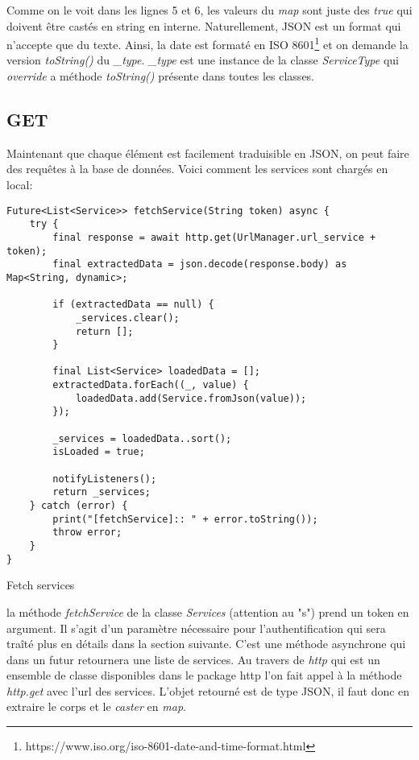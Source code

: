 Comme on le voit dans les lignes 5 et 6, les valeurs du \textit{map} sont juste des \textit{true} qui doivent être castés en string en interne.
Naturellement, JSON est un format qui n'accepte que du texte. Ainsi, la date est formaté en ISO 8601\footnote{https://www.iso.org/iso-8601-date-and-time-format.html} et on demande la version \textit{toString()} du \textit{\_type}. \textit{\_type} est une instance de la classe \textit{ServiceType} qui \textit{override} a méthode \textit{toString()} présente dans toutes les classes.
\newpage
\subsection*{GET}
Maintenant que chaque élément est facilement traduisible en JSON, on peut faire des requêtes à la base de données. Voici comment les services sont chargés en local:

\begin{listing}[!h]
\begin{verbatim}
Future<List<Service>> fetchService(String token) async {
    try {
        final response = await http.get(UrlManager.url_service + token);
        final extractedData = json.decode(response.body) as Map<String, dynamic>;

        if (extractedData == null) {
            _services.clear();
            return [];
        }

        final List<Service> loadedData = [];
        extractedData.forEach((_, value) {
            loadedData.add(Service.fromJson(value));
        });

        _services = loadedData..sort();
        isLoaded = true;

        notifyListeners();
        return _services;
    } catch (error) {
        print("[fetchService]:: " + error.toString());
        throw error;
    }
}    
\end{verbatim}
\caption{Fetch services}
\label{code:fetchService}
\end{listing}

la méthode \textit{fetchService} de la classe \textit{Services} (attention au "s") prend un token en argument. Il s'agit d'un paramètre nécessaire pour l'authentification qui sera traîté plus en détails dans la section suivante. C'est une méthode asynchrone qui dans un futur retournera une liste de services. Au travers de \textit{http} qui est un ensemble de classe disponibles dans le package http l'on fait appel à la méthode \textit{http.get} avec l'url des services. L'objet retourné est de type JSON, il faut donc en extraire le corps et le \textit{caster} en \textit{map}.

